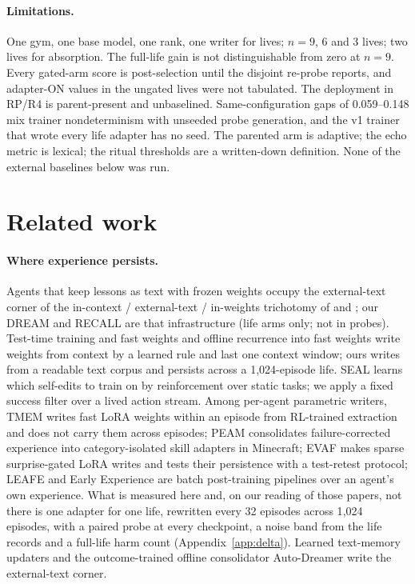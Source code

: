 \documentclass{article}
\begin{document}
\paragraph{Limitations.} One gym, one base model, one rank, one writer for lives; $n = 9$, 6 and 3 lives; two lives for absorption. The full-life gain is not distinguishable from zero at $n = 9$. Every gated-arm score is post-selection until the disjoint re-probe reports, and adapter-ON values in the ungated lives were not tabulated. The deployment in RP/R4 is parent-present and unbaselined. Same-configuration gaps of 0.059--0.148 mix trainer nondeterminism with unseeded probe generation, and the v1 trainer that wrote every life adapter has no seed. The parented arm is adaptive; the echo metric is lexical; the ritual thresholds are a written-down definition. None of the external baselines below was run.

\section{Related work}
\label{sec:related}

\paragraph{Where experience persists.} Agents that keep lessons as text with frozen weights \citep{shinn2023reflexion,park2023generative,packer2023memgpt,wang2023voyager,zhao2023expel,xu2025amem,zhang2026memskill} occupy the external-text corner of the in-context / external-text / in-weights trichotomy of \citet{dorovatas2026modular} and \citet{back2026lora}; our DREAM and RECALL are that infrastructure (life arms only; not in probes). Test-time training and fast weights \citep{sun2024ttt,behrouz2024titans} and offline recurrence into fast weights \citep{lee2026sleep} write weights from context by a learned rule and last one context window; ours writes from a readable text corpus and persists across a 1{,}024-episode life. SEAL \citep{zweiger2025seal} learns which self-edits to train on by reinforcement over static tasks; we apply a fixed success filter over a lived action stream. Among per-agent parametric writers, TMEM \citep{ren2026tmem} writes fast LoRA weights within an episode from RL-trained extraction and does not carry them across episodes; PEAM \citep{guo2026peam} consolidates failure-corrected experience into category-isolated skill adapters in Minecraft; EVAF \citep{han2026evaf} makes sparse surprise-gated LoRA writes and tests their persistence with a test-retest protocol; LEAFE \citep{ge2026leafe} and Early Experience \citep{zhang2025earlyexperience} are batch post-training pipelines over an agent's own experience. What is measured here and, on our reading of those papers, not there is one adapter for one life, rewritten every 32 episodes across 1{,}024 episodes, with a paired probe at every checkpoint, a noise band from the life records and a full-life harm count (Appendix~\ref{app:delta}). Learned text-memory updaters \citep{cai2026memopilot,tablan2026learningjob} and the outcome-trained offline consolidator Auto-Dreamer \citep{TODO-auto-dreamer} write the external-text corner.
\end{document}
